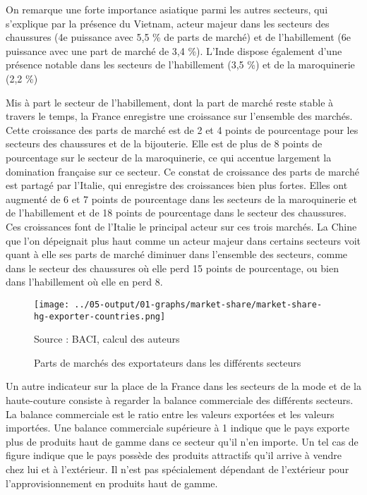\documentclass[french,10pt,a4paper]{article}
\begin{document}
On remarque une forte importance asiatique parmi les autres secteurs, qui s'explique par la présence du Vietnam, acteur majeur dans les secteurs des chaussures (4e puissance avec 5,5 \% de parts de marché) et de l'habillement (6e puissance avec une part de marché de 3,4 \%). L'Inde dispose également d'une présence notable dans les secteurs de l'habillement (3,5 \%) et de la maroquinerie (2,2 \%)

\medskip

Mis à part le secteur de l'habillement, dont la part de marché reste stable à travers le temps, la France enregistre une croissance sur l'ensemble des marchés. Cette croissance des parts de marché est de 2 et 4 points de pourcentage pour les secteurs des chaussures et de la bijouterie. Elle est de plus de 8 points de pourcentage sur le secteur de la maroquinerie, ce qui accentue largement la domination française sur ce secteur. Ce constat de croissance des parts de marché est partagé par l'Italie, qui enregistre des croissances bien plus fortes. Elles ont augmenté de 6 et 7 points de pourcentage dans les secteurs de la maroquinerie et de l'habillement et de 18 points de pourcentage dans le secteur des chaussures. Ces croissances font de l'Italie le principal acteur sur ces trois marchés. La Chine que l'on dépeignait plus haut comme un acteur majeur dans certains secteurs voit quant à elle ses parts de marché diminuer dans l'ensemble des secteurs, comme dans le secteur des chaussures où elle perd 15 points de pourcentage, ou bien dans l'habillement où elle en perd 8.

\begin{figure}[!h]
  \centering
  \texttt{[image: ../05-output/01-graphs/market-share/market-share-hg-exporter-countries.png]}
  \captionsetup{justification=raggedright,singlelinecheck=false, font=small}
  \caption*{Source : BACI, calcul des auteurs}
  \captionsetup{justification=centering, singlelinecheck=true, font=normalsize}
  \caption{Parts de marchés des exportateurs dans les différents secteurs}
  \label{fig:market-share}
\end{figure}


Un autre indicateur sur la place de la France dans les secteurs de la mode et de la haute-couture consiste à regarder la balance commerciale des différents secteurs. La balance commerciale est le ratio entre les valeurs exportées et les valeurs importées. Une balance commerciale supérieure à 1 indique que le pays exporte plus de produits haut de gamme dans ce secteur qu'il n'en importe. Un tel cas de figure indique que le pays possède des produits attractifs qu'il arrive à vendre chez lui et à l'extérieur. Il n'est pas spécialement dépendant de l'extérieur pour l'approvisionnement en produits haut de gamme.
\end{document}
